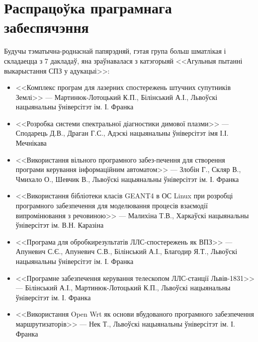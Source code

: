 \documentclass[10pt, a5paper]{article}
\begin{document}
\section{Распрацоўка праграмнага забеспячэння}
Будучы тэматычна-роднаснай папярэдняй, гэтая група больш шматлікая і складаецца з 7 дакладаў, яна зраўнавалася з катэгорыяй <<Агульныя пытанні выкарыстання СПЗ у адукацыі>>:
\begin{itemize}
\item <<Комплекс програм для лазерних спостережень штучних супутників Землі>> --- Мартинюк-Лотоцький К.П., Білінський А.І., Львоўскі нацыянальны ўніверсітэт ім. І. Франка
\item <<Розробка системи спектральної діагностики димової плазми>> --- Сподарець Д.В., Драган Г.С., Адэскі нацыянальны ўніверсітэт імя І.І. Мечнікава
\item <<Використання вільного програмного забез-печення для створення програми керування інформаційним автоматом>> --- Злобін Г., Скляр В., Чмихало О., Шевчик В., Львоўскі нацыянальны ўніверсітэт ім. І. Франка
\item <<Використання бібліотеки класів GEANT4 в ОС Linux при розробці програмного забезпечення для моделювання процесів взаємодії випромінювання з речовиною>> --- Малихіна Т.В., Харкаўскі нацыянальны ўніверсітэт ім. В.Н. Каразіна
\item  <<Програма для обробкирезультатів ЛЛС-спостережень як ВПЗ>> --- Апуневич С.Є., Апуневич С.В., Білінський А.І., Благодир Я.Т., Львоўскі нацыянальны ўніверсітэт ім. І. Франка
\item  <<Програмне забезпечення керування телескопом  ЛЛС-станції Львів-1831>> --- Білінський А.І., Мартинюк-Лотоцький К.П., Львоўскі нацыянальны ўніверсітэт ім. І. Франка
\item <<Використання Open Wrt як основи вбудованого програмного забезпечення маршрутизаторів>> --- Нек Т., Львоўскі нацыянальны ўніверсітэт ім. І. Франка
\end{itemize}
\end{document}
